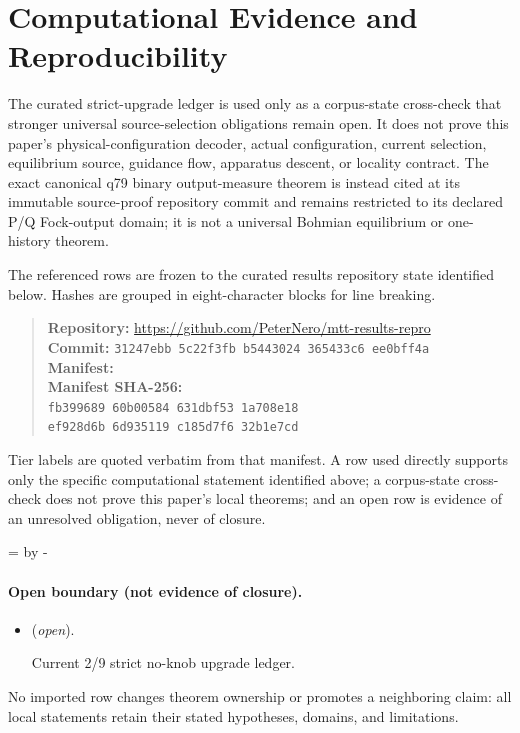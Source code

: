 \documentclass[11pt]{article}
\theoremstyle{definition}
\theoremstyle{remark}
\let\MTToriginalitem\item
\renewcommand{\item}{\par\MTToriginalitem}
\begin{document}


\section*{Computational Evidence and Reproducibility}
The curated strict-upgrade ledger is used only as a corpus-state cross-check that stronger universal source-selection obligations remain open. It does not prove this paper's physical-configuration decoder, actual configuration, current selection, equilibrium source, guidance flow, apparatus descent, or locality contract. The exact canonical q79 binary output-measure theorem is instead cited at its immutable source-proof repository commit and remains restricted to its declared P/Q Fock-output domain; it is not a universal Bohmian equilibrium or one-history theorem.

The referenced rows are frozen to the curated results repository state identified below. Hashes are grouped in eight-character blocks for line breaking.
\begin{quote}\small
\textbf{Repository:} \url{https://github.com/PeterNero/mtt-results-repro}\\
\textbf{Commit:} \texttt{31247ebb 5c22f3fb b5443024 365433c6 ee0bff4a}\\
\textbf{Manifest:} \\
\textbf{Manifest SHA-256:}\\
\texttt{fb399689 60b00584 631dbf53 1a708e18}\\
\texttt{ef928d6b 6d935119 c185d7f6 32b1e7cd}
\end{quote}

Tier labels are quoted verbatim from that manifest. A row used directly supports only the specific computational statement identified above; a corpus-state cross-check does not prove this paper's local theorems; and an open row is evidence of an unresolved obligation, never of closure.

\par\begingroup{}=\pagegoal\advance{} by -\pagetotal\ifdim\dimen0<7\baselineskip\newpage\fi\endgroup
\paragraph{Open boundary (not evidence of closure).}
\begin{itemize}
\setlength{\itemsep}{0.25em}
\item {} (\emph{open}).\par Current 2/9 strict no-knob upgrade ledger.
\end{itemize}

No imported row changes theorem ownership or promotes a neighboring claim: all local statements retain their stated hypotheses, domains, and limitations.


\end{document}
